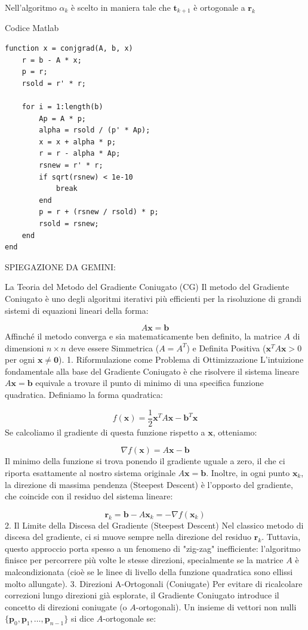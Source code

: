 \documentclass[10pt]{article}
\begin{document}
Nell'algoritmo $\alpha_k$ è scelto in maniera tale che $\mathbf{t}_{k+1}$ è ortogonale a $\mathbf{r}_k$

Codice Matlab
\begin{verbatim}
function x = conjgrad(A, b, x)
    r = b - A * x;
    p = r;
    rsold = r' * r;

    for i = 1:length(b)
        Ap = A * p;
        alpha = rsold / (p' * Ap);
        x = x + alpha * p;
        r = r - alpha * Ap;
        rsnew = r' * r;
        if sqrt(rsnew) < 1e-10
            break
        end
        p = r + (rsnew / rsold) * p;
        rsold = rsnew;
    end
end
\end{verbatim}

\dotfill

SPIEGAZIONE DA GEMINI:

La Teoria del Metodo del Gradiente Coniugato (CG)
Il metodo del Gradiente Coniugato è uno degli algoritmi iterativi più efficienti per la risoluzione di grandi sistemi di equazioni lineari della forma:

$$A \mathbf{x} = \mathbf{b}$$
Affinché il metodo converga e sia matematicamente ben definito, la matrice $A$ di dimensioni $n \times n$ deve essere Simmetrica ($A = A^T$) e Definita Positiva ($\mathbf{x}^T A \mathbf{x} > 0$ per ogni $\mathbf{x} \neq \mathbf{0}$).
1. Riformulazione come Problema di Ottimizzazione
L'intuizione fondamentale alla base del Gradiente Coniugato è che risolvere il sistema lineare $A \mathbf{x} = \mathbf{b}$ equivale a trovare il punto di minimo di una specifica funzione quadratica. Definiamo la forma quadratica:

$$f(\mathbf{x}) = \frac{1}{2} \mathbf{x}^T A \mathbf{x} - \mathbf{b}^T \mathbf{x}$$
Se calcoliamo il gradiente di questa funzione rispetto a $\mathbf{x}$, otteniamo:

$$\nabla f(\mathbf{x}) = A \mathbf{x} - \mathbf{b}$$
Il minimo della funzione si trova ponendo il gradiente uguale a zero, il che ci riporta esattamente al nostro sistema originale $A \mathbf{x} = \mathbf{b}$. Inoltre, in ogni punto $\mathbf{x}_k$, la direzione di massima pendenza (Steepest Descent) è l'opposto del gradiente, che coincide con il residuo del sistema lineare:

$$\mathbf{r}_k = \mathbf{b} - A \mathbf{x}_k = - \nabla f(\mathbf{x}_k)$$
2. Il Limite della Discesa del Gradiente (Steepest Descent)
Nel classico metodo di discesa del gradiente, ci si muove sempre nella direzione del residuo $\mathbf{r}_k$. Tuttavia, questo approccio porta spesso a un fenomeno di "zig-zag" inefficiente: l'algoritmo finisce per percorrere più volte le stesse direzioni, specialmente se la matrice $A$ è malcondizionata (cioè se le linee di livello della funzione quadratica sono ellissi molto allungate).
3. Direzioni A-Ortogonali (Coniugate)
Per evitare di ricalcolare correzioni lungo direzioni già esplorate, il Gradiente Coniugato introduce il concetto di direzioni coniugate (o $A$-ortogonali). Un insieme di vettori non nulli $\{ \mathbf{p}_0, \mathbf{p}_1, \dots, \mathbf{p}_{n-1} \}$ si dice $A$-ortogonale se:
\end{document}
